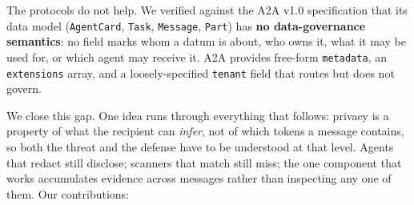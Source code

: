 \documentclass[conference,compsoc]{IEEEtran}
\begin{document}
The protocols do not help. We verified against the A2A v1.0 specification that its
data model (\texttt{AgentCard}, \texttt{Task}, \texttt{Message}, \texttt{Part})
has \textbf{no data-governance semantics}: no field marks whom a datum is about,
who owns it, what it may be used for, or which agent may receive it. A2A provides
free-form \texttt{metadata}, an \texttt{extensions} array, and a loosely-specified
\texttt{tenant} field that routes but does not govern.

We close this gap. One idea runs through everything that follows: privacy is a
property of what the recipient can \emph{infer}, not of which tokens a message
contains, so both the threat and the defense have to be understood at that level.
Agents that redact still disclose; scanners that match still miss; the one
component that works accumulates evidence across messages rather than inspecting
any one of them. Our contributions:
\end{document}
